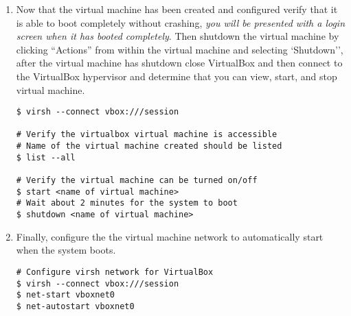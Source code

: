 \begin{enumerate}
\item	Now that the virtual machine has been created and configured verify that it is able to boot completely without crashing,
		\emph{you will be presented with a login screen when it has booted completely}. Then shutdown the virtual machine by clicking 
		``Actions'' from within the virtual machine and selecting `Shutdown'', after the virtual machine has shutdown close
		VirtualBox and then connect to the VirtualBox hypervisor and determine that you can view, start, and stop virtual machine.

\lstset{language=bash,caption=Verify VirtualBox Works with Virsh}
\begin{lstlisting}
$ virsh --connect vbox:///session

# Verify the virtualbox virtual machine is accessible
# Name of the virtual machine created should be listed
$ list --all

# Verify the virtual machine can be turned on/off
$ start <name of virtual machine>
# Wait about 2 minutes for the system to boot
$ shutdown <name of virtual machine>
\end{lstlisting}

\item	Finally, configure the the virtual machine network to automatically start when the system boots.

\lstset{language=bash,caption=Configure Network}
\begin{lstlisting}
# Configure virsh network for VirtualBox
$ virsh --connect vbox:///session
$ net-start vboxnet0
$ net-autostart vboxnet0
\end{lstlisting}				
\end{enumerate}




